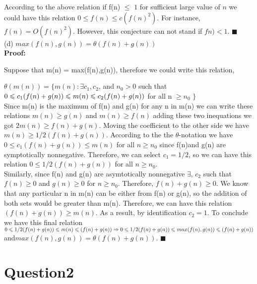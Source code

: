 \documentclass[12]{article}
\begin{document}
According to the above relation  if f(n) $\leqslant$ $1$ for sufficient large value of $n$  we could have this relation $0\leqslant f(n) \leqslant c(f(n)^2)$. For instance, $f(n) = O(f(n)^2)$. However, this conjecture can not stand if $fn) < 1 $.  $\blacksquare$\\   

(d) $max( f(n), g(n) ) = \theta(f(n) + g(n))$\\

\textbf{Proof:}

Suppose that m(n) = max(f(n),g(n)), therefore we could write this relation,

$\theta(m(n)) = \lbrace m(n):\exists c_1, c_2$, and $n_0>0$ such that$\linebreak 0\leqslant c_1(f(n) + g(n) ) \leqslant m(n) \leqslant c_2(f(n) + g(n))$ for all n $\geqslant n_0$ $\rbrace$\\


Since m(n) is the maximum of f(n) and g(n) for any n in m(n) we can write these relations  $m(n)\geqslant g(n)$ and $m(n) \geqslant f(n)$ adding these two inequations we got $ 2m(n)\geqslant f(n) + g(n)$. Moving the coefficient to the other side we have $m(n) \geqslant 1/2(f(n) + g(n))$. According to the the $\theta$-notation we have $0\leqslant c_1( f(n) + g(n) ) \leqslant m(n)$  for all $n \geqslant n_0$ since f(n)and g(n) are symptotically nonnegative. Therefore, we can select $c_1 = 1/2$, so we can have this relation $0\leqslant 1/2(f(n) + g(n))$ for all $n \geqslant n_0$.  \\

Similarly, since f(n) and g(n) are asymtotically nonnegative $\exists$, $c_2$ such that $f(n) \geqslant 0$ and $g(n) \geqslant 0$ for $n \geqslant n_0$. Therefore, $f(n) + g(n) \geqslant 0$. We know that any particular n in m(n) can be either from f(n) or g(n), so the addition of both sets would be greater than m(n). Therefore, we can have this relation $(f(n) + g(n)) \geqslant m(n)$. As a result, by identification $c_2 = 1$. To conclude we have this final relation 
$0 \leqslant 1/2(f(n) + g(n)) \leqslant m(n) \leqslant (f(n) + g(n))\linebreak  \Rightarrow 0 \leqslant 1/2( f(n) + g(n) ) \leqslant max( f(n),g(n)) \leqslant (f(n) + g(n))$ and\linebreak  $max(f(n), g(n)) = \theta(f(n) + g(n))$. $\blacksquare$\\

\section{Question2} 
\end{document}
